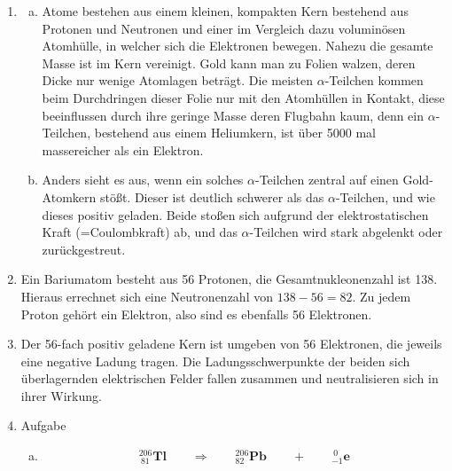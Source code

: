 \documentclass[a4paper]{article}
\begin{document}
\vspace{0.5 cm}


\begin{enumerate}
	\item
	
\begin{enumerate}[a)]	
\item  Atome bestehen aus einem kleinen, kompakten Kern bestehend aus Protonen und Neutronen und einer im Vergleich dazu voluminösen Atomhülle, in welcher sich die Elektronen bewegen. Nahezu die gesamte Masse ist im Kern vereinigt. Gold kann man zu Folien walzen, deren Dicke nur wenige Atomlagen beträgt. Die meisten $\alpha$-Teilchen kommen beim Durchdringen dieser Folie nur mit den Atomhüllen in Kontakt, diese beeinflussen durch ihre geringe Masse deren Flugbahn kaum, denn ein $\alpha$-Teilchen, bestehend aus einem Heliumkern, ist über 5000 mal massereicher als ein Elektron. 

\item Anders sieht es aus, wenn ein solches $\alpha$-Teilchen zentral auf einen Gold-Atomkern stößt. Dieser ist deutlich schwerer als das $\alpha$-Teilchen, und wie dieses positiv geladen. Beide stoßen sich aufgrund der elektrostatischen Kraft (=Coulombkraft) ab, und das $\alpha$-Teilchen wird stark abgelenkt oder zurückgestreut.
\end{enumerate} 

\item Ein Bariumatom besteht aus 56 Protonen, die Gesamtnukleonenzahl ist 138. Hieraus errechnet sich eine Neutronenzahl von $ 138-56= 82 $. Zu jedem Proton gehört ein Elektron, also sind es ebenfalls 56 Elektronen.

\item Der 56-fach positiv geladene Kern ist umgeben von 56 Elektronen, die jeweils eine negative Ladung tragen. Die Ladungsschwerpunkte der beiden sich überlagernden elektrischen Felder fallen zusammen und neutralisieren sich in ihrer Wirkung.

\item Aufgabe 
\begin{enumerate}[a)]
	\item $$ {}^{206}_{~81}\mathbf{Tl} \qquad \Longrightarrow \qquad {}^{206}_{82}\mathbf{Pb} \qquad + \qquad {}^{~0}_{-1}\mathbf{e}$$


\end{enumerate}
\end{enumerate}
\end{document}
